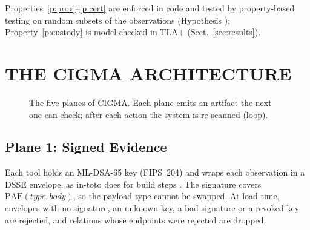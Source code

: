 \documentclass[a4paper,twoside]{article}
\newcommand{\cigma}{CIGMA\xspace}
\begin{document}
Properties~\ref{p:prov}--\ref{p:cert} are enforced in code and tested by property-based testing on random subsets of the observations (Hypothesis \cite{maciver2019hypothesis}); Property~\ref{p:custody} is model-checked in TLA+ \cite{lamport2002tla} (Sect.~\ref{sec:results}).

\section{\uppercase{The CIGMA Architecture}}
\label{sec:arch}

\begin{figure}[t]
\centering
{}
\caption{The five planes of \cigma. Each plane emits an artifact the next one can check; after each action the system is re-scanned (loop).}
\label{fig:arch}
\end{figure}

\subsection{Plane 1: Signed Evidence}
Each tool holds an ML-DSA-65 key (FIPS~204) \cite{nist2024fips204} and wraps each observation in a DSSE envelope, as in-toto does for build steps \cite{torresarias2019intoto}. The signature covers $\mathrm{PAE}(\mathit{type},\mathit{body})$, so the payload type cannot be swapped. At load time, envelopes with no signature, an unknown key, a bad signature or a revoked key are rejected, and relations whose endpoints were rejected are dropped.
\end{document}
